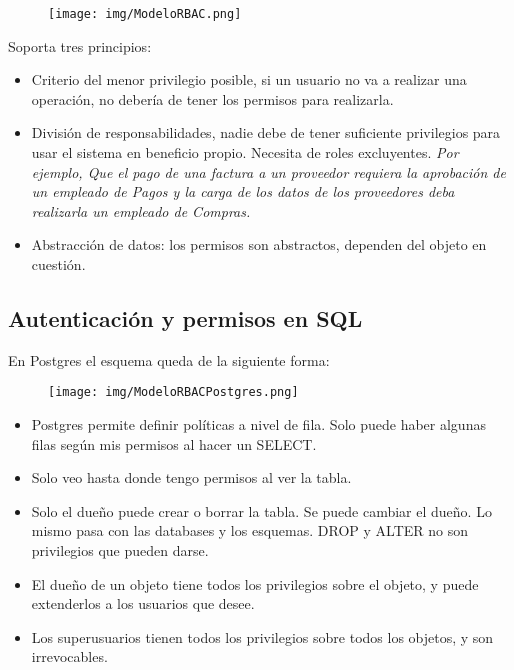 \newpage
\begin{figure}[!htb]
    \centering
    \texttt{[image: img/ModeloRBAC.png]}
\end{figure}


Soporta tres principios:

\begin{itemize}
\item Criterio del menor privilegio posible, si un usuario no va a realizar una operación, no debería de tener los permisos para realizarla.
\item División de responsabilidades, nadie debe de tener suficiente privilegios para usar el sistema en beneficio propio. Necesita de roles excluyentes. \textit{Por ejemplo, Que el pago de una factura a un proveedor requiera la aprobación de un empleado de Pagos y la carga de los datos de los proveedores deba realizarla un empleado de Compras.}
\item Abstracción de datos: los permisos son abstractos, dependen del objeto en cuestión.
\end{itemize}

\newpage
\subsection*{Autenticación y permisos en SQL}

En Postgres el esquema queda de la siguiente forma:

\begin{figure}[!htb]
    \centering
    \texttt{[image: img/ModeloRBACPostgres.png]}
\end{figure}


\begin{itemize}
\item Postgres permite definir políticas a nivel de fila. Solo puede haber algunas filas según mis permisos al hacer un SELECT.
\item Solo veo hasta donde tengo permisos al ver la tabla.
\item Solo el dueño puede crear o borrar la tabla. Se puede cambiar el dueño. Lo mismo pasa con las databases y los esquemas. DROP y ALTER no son privilegios que pueden darse.
\item El dueño de un objeto tiene todos los privilegios sobre el objeto, y puede extenderlos a los usuarios que desee.
\item Los superusuarios tienen todos los privilegios sobre todos los objetos, y son irrevocables.
\end{itemize}

